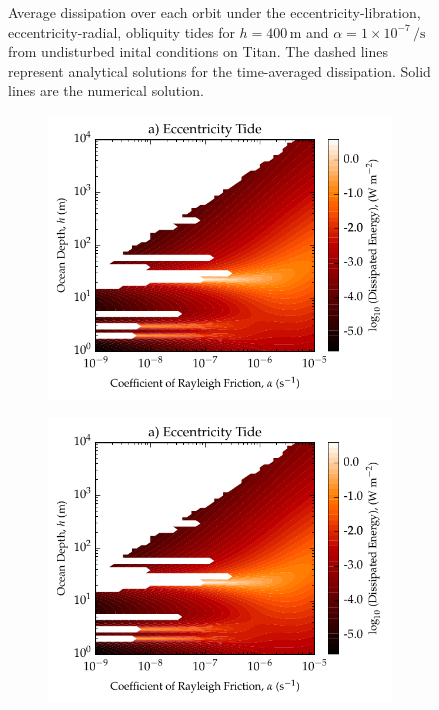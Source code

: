 \begin{figure}[!t]
\begin{subfigure}{\linewidth}
\subcaption{\label{fig:diss_c}}
\end{subfigure}
\vspace*{-0.8cm}
\caption{Average dissipation over each orbit under the eccentricity-libration, eccentricity-radial, obliquity tides for $h = 400 \, \si{\metre}$ and $\alpha = 1 \times 10^{-7} \, \si{\per\second}$ from undisturbed inital conditions on Titan. The dashed lines represent analytical solutions for the time-averaged dissipation. Solid lines are the numerical solution. \label{fig:diss}}
\end{figure}

%

\begin{figure}[!t]
\centering
\begin{subfigure}{0.48\linewidth}
\centering
\includegraphics[width=\linewidth]{Figures/Eccentricity_RayleighFric}
\subcaption{\label{fig:rayleighFricEcc}}
\end{subfigure}%
\begin{subfigure}{0.48\linewidth}
\centering
\includegraphics[width=\linewidth]{Figures/Eccentricity_RayleighFric}

\end{subfigure}
\end{figure}
